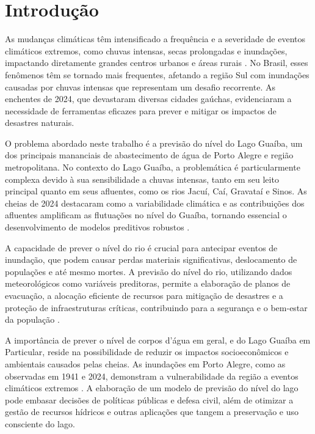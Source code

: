 \chapter{Introdução}
As mudanças climáticas têm intensificado a frequência e a severidade de eventos climáticos extremos, como chuvas intensas, secas prolongadas e inundações, impactando diretamente grandes centros urbanos e áreas rurais \cite{veja2024}. No Brasil, esses fenômenos têm se tornado mais frequentes, afetando a região Sul com inundações causadas por chuvas intensas que representam um desafio recorrente. As enchentes de 2024, que devastaram diversas cidades gaúchas, evidenciaram a necessidade de ferramentas eficazes para prever e mitigar os impactos de desastres naturais.

O problema abordado neste trabalho é a previsão do nível do Lago Guaíba, um dos principais mananciais de abastecimento de água de Porto Alegre e região metropolitana. No contexto do Lago Guaíba, a problemática é particularmente complexa devido à sua sensibilidade a chuvas intensas, tanto em seu leito principal quanto em seus afluentes, como os rios Jacuí, Caí, Gravataí e Sinos. As cheias de 2024 destacaram como a variabilidade climática e as contribuições dos afluentes amplificam as flutuações no nível do Guaíba, tornando essencial o desenvolvimento de modelos preditivos robustos \cite{veja2024}.

A capacidade de prever o nível do rio é crucial para antecipar eventos de inundação, que podem causar perdas materiais significativas, deslocamento de populações e até mesmo mortes. A previsão do nível do rio, utilizando dados meteorológicos como variáveis preditoras, permite a elaboração de planos de evacuação, a alocação eficiente de recursos para mitigação de desastres e a proteção de infraestruturas críticas, contribuindo para a segurança e o bem-estar da população \cite{andrade2017}.

A importância de prever o nível de corpos d'água em geral, e do Lago Guaíba em Particular, reside na possibilidade de reduzir os impactos socioeconômicos e ambientais causados pelas cheias. As inundações em Porto Alegre, como as observadas em 1941 e 2024, demonstram a vulnerabilidade da região a eventos climáticos extremos \cite{veja2024}. A elaboração de um modelo de previsão do nível do lago pode embasar decisões de políticas públicas e defesa civil, além de otimizar a gestão de recursos hídricos e outras aplicações que tangem a preservação e uso consciente do lago.

